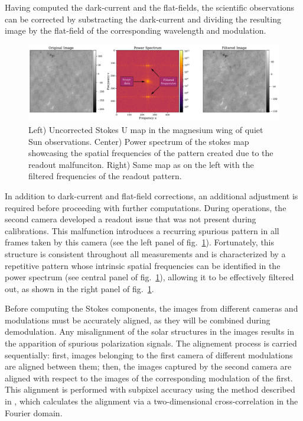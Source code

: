 Having computed the dark-current and the flat-fields, the scientific observations can be corrected by substracting the dark-current and dividing the resulting image by the flat-field of the corresponding wavelength and modulation. 

\begin{figure}
  \includegraphics[width=\textwidth]{figures/Pipeline/readout_problem.pdf}
  \caption[Readout pattern filtering]{Left) Uncorrected Stokes U map in the magnesium wing of quiet Sun observations. Center) Power spectrum of the stokes map showcasing the spatial frequencies of the pattern created due to the readout malfunciton. Right) Same map as on the left with the filtered frequencies of the readout pattern.}
    \label{fig_pipeline: readout}
\end{figure}

In addition to dark-current and flat-field corrections, an additional adjustment is required before proceeding with further computations. During operations, the second camera developed a readout issue that was not present during calibrations. This malfunction introduces a recurring spurious pattern in all frames taken by this camera (see the left panel of fig.~\ref{fig_pipeline: readout}). Fortunately, this structure is consistent throughout all measurements and is characterized by a repetitive pattern whose intrinsic spatial frequencies can be identified in the power spectrum (see central panel of fig.~\ref{fig_pipeline: readout}), allowing it to be effectively filtered out, as shown in the right panel of fig.~\ref{fig_pipeline: readout}.  


Before computing the Stokes components, the images from different cameras and modulations must be accurately aligned, as they will be combined during demodulation. Any misalignment of the solar structures in the images results in the apparition of spurious polarization signals. The alignement process is carried sequentially: first, images belonging to the first camera of different modulations are aligned between them; then, the images captured by the second camera are aligned with respect to the images of the corresponding modulation of the first. This alignment is performed with subpixel accuracy using the method described in \cite{alineamiento}, which calculates the alignment via a two-dimensional cross-correlation in the Fourier domain.

